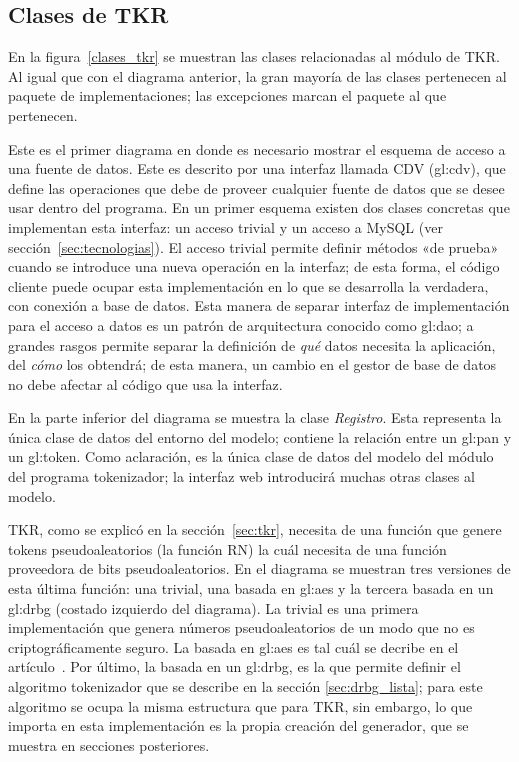 %
%
%

\subsection{Clases de TKR}
\label{sec:tkr_disenio}

En la figura~\ref{clases_tkr} se muestran las clases relacionadas al módulo de
TKR. Al igual que con el diagrama anterior, la gran mayoría de las clases
pertenecen al paquete de implementaciones; las excepciones marcan el paquete al
que pertenecen.

Este es el primer diagrama en donde es necesario mostrar el esquema de acceso a
una fuente de datos. Este es descrito por una interfaz llamada CDV
(\acrlong{gl:cdv}), que define las operaciones que debe de proveer cualquier
fuente de datos que se desee usar dentro del programa. En un primer esquema
existen dos clases concretas que implementan esta interfaz: un acceso trivial y
un acceso a MySQL (ver sección~\ref{sec:tecnologias}). El acceso trivial permite
definir métodos «de prueba» cuando se introduce una nueva operación en la
interfaz; de esta forma, el código cliente puede ocupar esta implementación en
lo que se desarrolla la verdadera, con conexión a base de datos. Esta manera de
separar interfaz de implementación para el acceso a datos es un patrón de
arquitectura conocido como \gls{gl:dao}; a grandes rasgos permite separar la
definición de \textit{qué} datos necesita la aplicación, del \textit{cómo} los
obtendrá; de esta manera, un cambio en el gestor de base de datos no debe
afectar al código que usa la interfaz.

En la parte inferior del diagrama se muestra la clase \textit{Registro}. Esta
representa la única clase de datos del entorno del modelo; contiene la relación
entre un \gls{gl:pan} y un \gls{gl:token}. Como aclaración, es la única clase de
datos del modelo del módulo del programa tokenizador; la interfaz web
introducirá muchas otras clases al modelo.

TKR, como se explicó en la sección~\ref{sec:tkr}, necesita de una función que
genere tokens pseudoaleatorios (la función RN) la cuál necesita de una función
proveedora de bits pseudoaleatorios. En el diagrama se muestran tres versiones
de esta última función: una trivial, una basada en \gls{gl:aes} y la tercera
basada en un \gls{gl:drbg} (costado izquierdo del diagrama). La trivial es una
primera implementación que genera números pseudoaleatorios de un modo que no es
criptográficamente seguro. La basada en \gls{gl:aes} es tal cuál se decribe en
el artículo~\cite{doc_sandra}. Por último, la basada en un \gls{gl:drbg},
es la que permite definir el algoritmo tokenizador que se describe en la sección
\ref{sec:drbg_lista}; para este algoritmo se ocupa la misma estructura que para
TKR, sin embargo, lo que importa en esta implementación es la propia creación
del generador, que se muestra en secciones posteriores.

